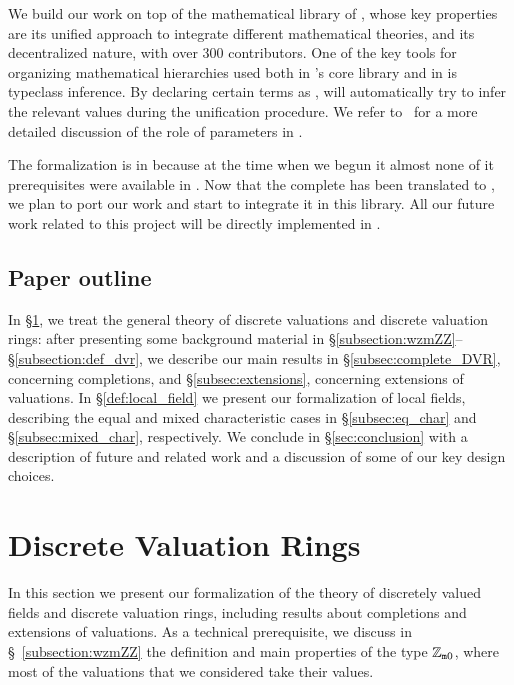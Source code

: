 \documentclass[sigplan,10pt,anonymous,review]{acmart}
\begin{document}
We build our work on top of the mathematical library \mathlib of \lean{\empty}, whose key properties are its unified approach to integrate different mathematical theories, and its decentralized nature, with over 300 contributors. One of the key tools for organizing mathematical hierarchies used both in \lean[\empty]'s core library and in \mathlib is typeclass inference. By declaring certain terms as , \lean[\empty] will automatically try to infer the relevant values during the unification procedure. We refer to~\cite{Baa22} for a more detailed discussion of the role of  parameters in \lean[\empty].

The formalization is in \lean because at the time when we begun it almost none of it prerequisites were available in \lean[4]. Now that the complete \mathlib has been translated to \lean[4], we plan to port our work and start to integrate it in this library. All our future work related to this project will be directly implemented in \lean[4].

\subsection{Paper outline}
In \S\ref{section:dvr}, we treat the general theory of discrete valuations and discrete valuation rings: after presenting some background material in \S\ref{subsection:wzmZZ}--\S\ref{subsection:def_dvr}, we describe our main results in \S\ref{subsec:complete_DVR}, concerning completions, and \S\ref{subsec:extensions}, concerning extensions of valuations. In \S\ref{def:local_field} we present our formalization of local fields, describing the equal and mixed characteristic cases in \S\ref{subsec:eq_char} and \S\ref{subsec:mixed_char}, respectively. We conclude in \S\ref{sec:conclusion} with a description of future and related work and a discussion of some of our key design choices.

\section {Discrete Valuation Rings}\label{section:dvr}

In this section we present our formalization of the theory of discretely valued fields and discrete valuation rings, including results about completions and extensions of valuations. As a technical prerequisite, we discuss in \S~\ref{subsection:wzmZZ} the definition and main properties of the \mathlib type $\mathbb{Z}_{\mathtt{m}0}$, where most of the valuations that we considered take their values.
\end{document}
